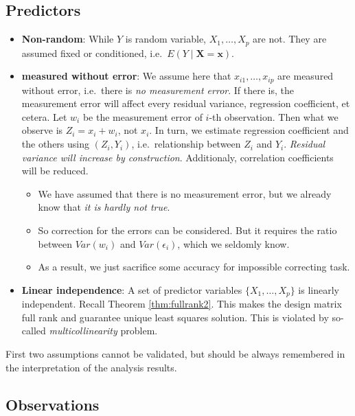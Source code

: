 \documentclass[]{book}
\providecommand{\tightlist}{%
  \setlength{\itemsep}{0pt}\setlength{\parskip}{0pt}}
\theoremstyle{definition}
\theoremstyle{definition}
\theoremstyle{definition}
\theoremstyle{remark}
\begin{document}
\hypertarget{xassumption}{%
\subsection{Predictors}\label{xassumption}}

\begin{itemize}
\tightlist
\item
  \textbf{Non-random}: While \(Y\) is random variable, \(X_1, \ldots, X_p\) are not. They are assumed fixed or conditioned, i.e.~\(E(Y \mid \mathbf{X} = \mathbf{x})\).
\item
  \textbf{measured without error}: We assume here that \(x_{i1}, \ldots, x_{ip}\) are measured without error, i.e.~there is \emph{no measurement error}. If there is, the measurement error will affect every residual variance, regression coefficient, et cetera. Let \(w_i\) be the measurement error of \(i\)-th observation. Then what we observe is \(Z_i = x_i + w_i\), not \(x_i\). In turn, we estimate regression coefficient and the others using \((Z_i, Y_i)\), i.e.~relationship between \(Z_i\) and \(Y_i\). \emph{Residual variance will increase by construction}. Additionaly, correlation coefficients will be reduced.

  \begin{itemize}
  \tightlist
  \item
    We have assumed that there is no measurement error, but we already know that \emph{it is hardly not true}.
  \item
    So correction for the errors can be considered. But it requires the ratio between \(Var(w_i)\) and \(Var(\epsilon_i)\), which we seldomly know.
  \item
    As a result, we just sacrifice some accuracy for impossible correcting task.
  \end{itemize}
\item
  \textbf{Linear independence}: A set of predictor variables \(\{ X_1, \ldots, X_p \}\) is linearly independent. Recall Theorem \ref{thm:fullrank2}. This makes the design matrix full rank and guarantee unique least squares solution. This is violated by so-called \emph{multicollinearity} problem.
\end{itemize}

First two assumptions cannot be validated, but should be always remembered in the interpretation of the analysis results.

\hypertarget{obsassumption}{%
\subsection{Observations}\label{obsassumption}}
\end{document}
